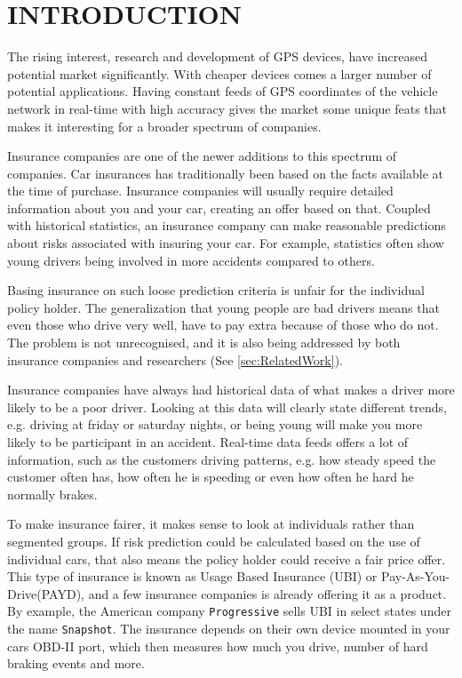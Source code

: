 \section{INTRODUCTION}
\label{sec:intro}

The rising interest, research and development of GPS devices, have increased potential market significantly. With cheaper devices comes a larger number of potential applications. Having constant feeds of GPS coordinates of the vehicle network in real-time with high accuracy gives the market some unique feats that makes it interesting for a broader spectrum of companies.

Insurance companies are one of the newer additions to this spectrum of companies. Car insurances has traditionally been based on the facts available at the time of purchase. Insurance companies will usually require detailed information about you and your car, creating an offer based on that. Coupled with historical statistics, an insurance company can make reasonable predictions about risks associated with insuring your car. For example, statistics often show young drivers being involved in more accidents compared to others\cite{accidents}.

Basing insurance on such loose prediction criteria is unfair for the individual policy holder. The generalization that young people are bad drivers means that even those who drive very well, have to pay extra because of those who do not. The problem is not unrecognised, and it is also being addressed by both insurance companies and researchers (See \ref{sec:RelatedWork}).

Insurance companies have always had historical data of what makes a driver more likely to be a poor driver. Looking at this data will clearly state different trends\cite{url:forbes}, e.g. driving at friday or saturday nights, or being young will make you more likely to be participant in an accident. Real-time data feeds offers a lot of information, such as the customers driving patterns, e.g. how steady speed the customer often has, how often he is speeding or even how often he hard he normally brakes.

To make insurance fairer, it makes sense to look at individuals rather than segmented groups. If risk prediction could be calculated based on the use of individual cars, that also means the policy holder could receive a fair price offer. This type of insurance is known as Usage Based Insurance (UBI) or Pay-As-You-Drive(PAYD), and a few insurance companies is already offering it as a product. By example, the American company \texttt{Progressive} sells UBI in select states under the name \texttt{Snapshot}\cite{snapshot}. The insurance depends on their own device mounted in your cars OBD-II port, which then measures how much you drive, number of hard braking events and more.

